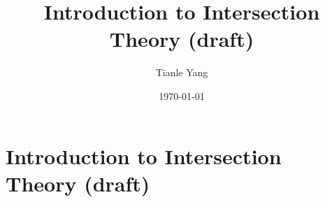 \documentclass{noteformyself}
\title{Introduction to Intersection Theory (draft)}
\author{Tianle Yang}
\date{\today}
\begin{document}
    \maketitle

    \section{Introduction to Intersection Theory (draft)}



\end{document}
